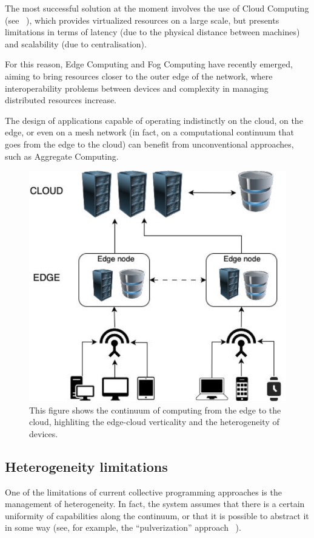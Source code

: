 The most successful solution at the moment involves the use of Cloud Computing (see ~),
which provides virtualized resources on a large scale, but presents limitations in terms of latency (due to the physical
distance between machines) and scalability (due to centralisation).

For this reason, Edge Computing and Fog Computing have recently emerged, aiming to bring resources closer to the outer
edge of the network, where interoperability problems between devices and complexity in managing distributed resources increase.

The design of applications capable of operating indistinctly on the cloud, on the edge, or even on a mesh network
(in fact, on a computational continuum that goes from the edge to the cloud) can benefit from unconventional approaches,
such as Aggregate Computing.

\begin{figure}
    \centering
    \includegraphics[width=.5\linewidth]{figures/edge-cloud}
    \caption{This figure shows the continuum of computing from the edge to the cloud, highliting the edge-cloud verticality
    and the heterogeneity of devices.}
    \label{fig:cloud-edge-continuum}
\end{figure}

\subsection{Heterogeneity limitations}
\label{subsec:heterogeneity-limitations}

One of the limitations of current collective programming approaches is the management of heterogeneity.
In fact, the system assumes that there is a certain uniformity of capabilities along the continuum, or that it is possible
to abstract it in some way (see, for example, the ``pulverization'' approach ~\cite{fi12110203}).


